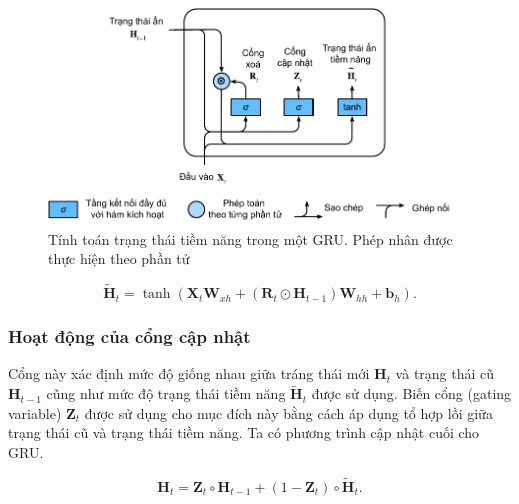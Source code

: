 \documentclass[conference]{IEEEtran}
\begin{document}
\begin{figure}[H]
    \centering
    \begin{minipage}{0.23\textwidth}
        \centering
        \includegraphics[width=1\textwidth]{bibliography/figure/GRU/gru_2.pdf}
        \caption{Tính toán trạng thái tiềm năng trong một GRU. Phép nhân được thực hiện theo phần tử}
        \label{fig:gru_del}
    \end{minipage}

\end{figure}

\begin{equation*}
    \tilde{\mathbf{H}}_t = \tanh (\mathbf{X}_t \mathbf{W}_{xh} + (\mathbf{R}_t \odot \mathbf{H}_{t-1}) \mathbf{W}_{hh} + \mathbf{b}_h).
\end{equation*}

\subsubsection{Hoạt động của cổng cập nhật}
Cổng này xác định mức độ giống nhau giữa tráng thái mới \(\mathbf{H}_t \) và trạng thái cũ \(\mathbf{H}_{t-1}\) cũng như mức độ trạng thái tiềm năng \(\widetilde{\mathbf{H}}_t\) được sử dụng. Biến cổng (gating variable) \(\mathbf{Z}_t\) được sử dụng cho mục đích này bằng cách áp dụng tổ hợp lồi giữa trạng thái cũ và trạng thái tiềm năng. Ta có phương
trình cập nhật cuối cho GRU.

\begin{equation*}
    \mathbf{H}_t = \mathbf{Z}_t \circ \mathbf{H}_{t-1} + (1 - \mathbf{Z}_t) \circ \tilde{\mathbf{H}}_t.
\end{equation*}
\end{document}
